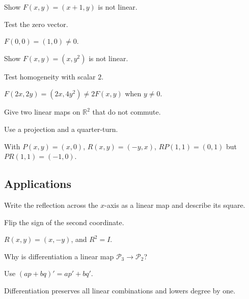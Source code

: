 \begin{exercise}[Translation]\label{exr:i05-expand-10}
Show \(F(x,y)=(x+1,y)\) is not linear.
\end{exercise}
\begin{hint}
Test the zero vector.
\end{hint}
\begin{solution}
\(F(0,0)=(1,0)\neq0\).
\end{solution}

\begin{exercise}\label{exr:i05-expand-11}
Show \(F(x,y)=(x,y^2)\) is not linear.
\end{exercise}
\begin{hint}
Test homogeneity with scalar \(2\).
\end{hint}
\begin{solution}
\(F(2x,2y)=(2x,4y^2)\neq2F(x,y)\) when \(y\neq0\).
\end{solution}

\begin{exercise}\label{exr:i05-expand-12}
Give two linear maps on \(\mathbb R^2\) that do not commute.
\end{exercise}
\begin{hint}
Use a projection and a quarter-turn.
\end{hint}
\begin{solution}
With \(P(x,y)=(x,0)\), \(R(x,y)=(-y,x)\), \(RP(1,1)=(0,1)\) but \(PR(1,1)=(-1,0)\).
\end{solution}

\subsection*{Applications}

\begin{exercise}[Reflection]\label{exr:i05-expand-13}
Write the reflection across the \(x\)-axis as a linear map and describe its square.
\end{exercise}
\begin{hint}
Flip the sign of the second coordinate.
\end{hint}
\begin{solution}
\(R(x,y)=(x,-y)\), and \(R^2=I\).
\end{solution}

\begin{exercise}[Differentiation]\label{exr:i05-expand-14}
Why is differentiation a linear map \(\mathcal P_3\to\mathcal P_2\)?
\end{exercise}
\begin{hint}
Use \((ap+bq)'=ap'+bq'\).
\end{hint}
\begin{solution}
Differentiation preserves all linear combinations and lowers degree by one.
\end{solution}

